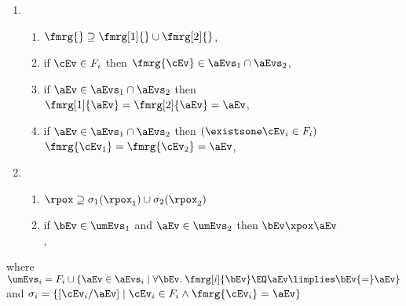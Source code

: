 \begin{figure}
\begin{multicols}{2}
\begin{enumerate}[topsep=0pt,label=(\textsc{s}\arabic*),ref=\textsc{s}\arabic*]
      \setcounter{enumi}{\value{m}}
    \item[] 
      \begin{enumerate}[leftmargin=0pt]
      \item \label{seq-m-include}
        $\fmrg{}\supseteq\fmrg[1]{}\cup\fmrg[2]{}$,
      \item \label{seq-m-phantom-forall}
        if $\cEv\in {\phEvs_i}$ then
        $\fmrg{\cEv}\in {\aEvs_1\cap\aEvs_2}$,
      \columnbreak
      \item \label{seq-m-exclude}
        if $\aEv\in {\aEvs_1\cap\aEvs_2}$
        then $\fmrg[1]{\aEv}=\fmrg[2]{\aEv}=\aEv$,
      \item \label{seq-m-phantom-exists}
        if $\aEv\in {\aEvs_1\cap\aEvs_2}$ then
        $(\existsone\cEv_i\in\phEvs_i)$
        $\fmrg{\cEv_1}=\fmrg{\cEv_2}=\aEv$,
      \end{enumerate}

      \setcounter{enumi}{\value{po}}
    \item[] 
      \begin{enumerate}[leftmargin=0pt]
      \item \label{seq-po-include}
        ${\rpox}\supseteq \sigma_1({\rpox_1})\cup  \sigma_2({\rpox_2})$
      \item \label{seq-po-seq}
        if $\bEv\in\umEvs_1$ and $\aEv\in\umEvs_2$ then $\bEv\xpox\aEv$,
      \end{enumerate}
    \end{enumerate}
    where
    \begin{math}
      \umEvs_i= \phEvs_i \cup \{\aEv\in\aEvs_i\mid\forall\bEv.\;\fmrg[i]{\bEv}\EQ\aEv \limplies \bEv{=}\aEv\}
    \end{math}
    and
    \begin{math}
      \sigma_i=\{[\cEv_i/\aEv]\mid\cEv_i\in\phEvs_i\land \fmrg{\cEv_i}=\aEv\}
    \end{math}


\end{multicols}
\end{figure}
